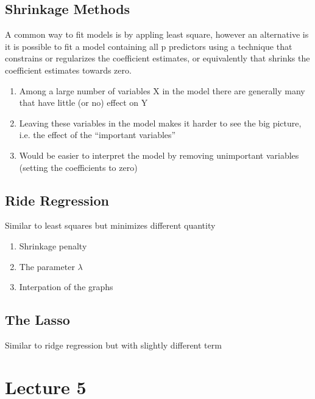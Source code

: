 \documentclass[12pt]{article}
\numberwithin{equation}{section}
\begin{document}
\subsection{Shrinkage Methods}
A common way to fit models is by appling least square, however an alternative is it is possible to fit a model containing all p predictors using a technique that constrains or regularizes the coefficient estimates, or equivalently that shrinks the coefficient estimates towards zero.
\begin{enumerate}
    \item Among a large number of variables X in the model there are generally many that have little (or no) effect on Y
    \item Leaving these variables in the model makes it harder to see the big picture, i.e. the effect of the “important variables”
    \item Would be easier to interpret the model by removing unimportant variables (setting the coefficients to zero)
\end{enumerate}
\subsection{Ride Regression}
Similar to least squares but minimizes different quantity
\begin{enumerate}
    \item Shrinkage penalty
    \item The parameter $\lambda$
    \item Interpation of the graphs
    
\end{enumerate}
\subsection{The Lasso}
Similar to ridge regression but with slightly different term
\section{Lecture 5}
\end{document}
